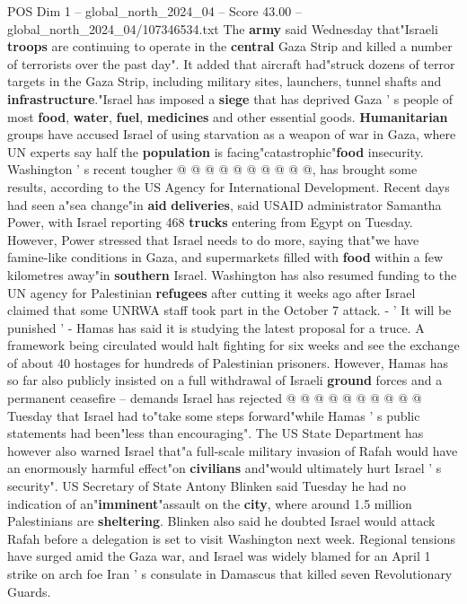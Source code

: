 \begin{textsample}{POS Dim 1 – global\_north\_2024\_04 – Score 43.00 – global\_north\_2024\_04/107346534.txt}
The \textbf{army} said Wednesday that"Israeli \textbf{troops} are continuing to operate in the \textbf{central} Gaza Strip and killed a number of terrorists over the past day".
It added that aircraft had"struck dozens of terror targets in the Gaza Strip, including military sites, launchers, tunnel shafts and \textbf{infrastructure}."Israel has imposed a \textbf{siege} that has deprived Gaza ' s people of most \textbf{food}, \textbf{water}, \textbf{fuel}, \textbf{medicines} and other essential goods. \textbf{Humanitarian} groups have accused Israel of using starvation as a weapon of war in Gaza, where UN experts say half the \textbf{population} is facing"catastrophic"\textbf{food} insecurity.
Washington ' s recent tougher @ @ @ @ @ @ @ @ @ @, has brought some results, according to the US Agency for International Development.
Recent days had seen a"sea change"in \textbf{aid} \textbf{deliveries}, said USAID administrator Samantha Power, with Israel reporting 468 \textbf{trucks} entering from Egypt on Tuesday.
However, Power stressed that Israel needs to do more, saying that"we have famine-like conditions in Gaza, and supermarkets filled with \textbf{food} within a few kilometres away"in \textbf{southern} Israel.
Washington has also resumed funding to the UN agency for Palestinian \textbf{refugees} after cutting it weeks ago after Israel claimed that some UNRWA staff took part in the October 7 attack. - ' It will be punished ' - Hamas has said it is studying the latest proposal for a truce.
A framework being circulated would halt fighting for six weeks and see the exchange of about 40 hostages for hundreds of Palestinian prisoners.
However, Hamas has so far also publicly insisted on a full withdrawal of Israeli \textbf{ground} forces and a permanent ceasefire -- demands Israel has rejected @ @ @ @ @ @ @ @ @ @ Tuesday that Israel had to"take some steps forward"while Hamas ' s public statements had been"less than encouraging".
The US State Department has however also warned Israel that"a full-scale military invasion of Rafah would have an enormously harmful effect"on \textbf{civilians} and"would ultimately hurt Israel ' s security".
US Secretary of State Antony Blinken said Tuesday he had no indication of an"\textbf{imminent}"assault on the \textbf{city}, where around 1.5 million Palestinians are \textbf{sheltering}.
Blinken also said he doubted Israel would attack Rafah before a delegation is set to visit Washington next week.
Regional tensions have surged amid the Gaza war, and Israel was widely blamed for an April 1 strike on arch foe Iran ' s consulate in Damascus that killed seven Revolutionary Guards.

\end{textsample}
